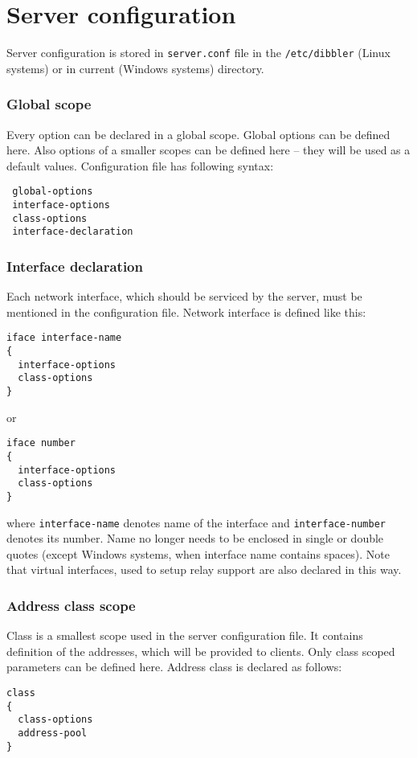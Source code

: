 

\section{Server configuration}
\label{server-conf}
Server configuration is stored in \verb+server.conf+ file in the
\verb+/etc/dibbler+ (Linux systems) or in current (Windows systems)
directory.

\subsubsection{Global scope}
\label{server-global-scope}
Every option can be declared in a global scope. Global options can be
defined here. Also options of a smaller scopes can be defined here --
they will be used as a default values. Configuration file has following syntax:

\begin{lstlisting}
 global-options
 interface-options
 class-options
 interface-declaration
\end{lstlisting}

\subsubsection{Interface declaration}
\label{server-iface-scope}
Each network interface, which should be serviced by the server, must be
mentioned in the configuration file. Network interface is defined like this:
\begin{lstlisting}
iface interface-name
{
  interface-options
  class-options
}
\end{lstlisting}

or

\begin{lstlisting}
iface number
{
  interface-options
  class-options
}
\end{lstlisting}

where \verb+interface-name+ denotes name of the interface and
\verb+interface-number+ denotes its number. Name no longer needs to be
enclosed in single or double quotes (except Windows systems, when
interface name contains spaces). Note that virtual interfaces, used
to setup relay support are also declared in this way.

\subsubsection{Address class scope}
\label{server-class-scope}
Class is a smallest scope used in the server configuration file. It
contains definition of the addresses, which will be provided to
clients. Only class scoped parameters can be defined here. Address class
is declared as follows:
\begin{lstlisting}
class
{
  class-options
  address-pool
}
\end{lstlisting}

